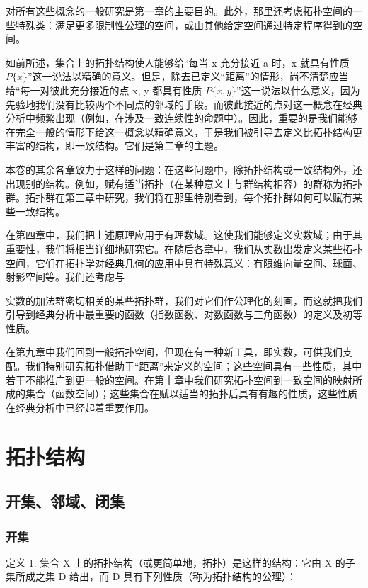 对所有这些概念的一般研究是第一章的主要目的。此外，那里还考虑拓扑空间的一些特殊类：满足更多限制性公理的空间，或由其他给定空间通过特定程序得到的空间。

如前所述，集合上的拓扑结构使人能够给“每当 x 充分接近 a 时，x 就具有性质 \(P\{x\}\)”这一说法以精确的意义。但是，除去已定义“距离”的情形，尚不清楚应当给“每一对彼此充分接近的点 x, y 都具有性质 \(P\{x, y\}\)”这一说法以什么意义，因为先验地我们没有比较两个不同点的邻域的手段。而彼此接近的点对这一概念在经典分析中频繁出现（例如，在涉及一致连续性的命题中）。因此，重要的是我们能够在完全一般的情形下给这一概念以精确意义，于是我们被引导去定义比拓扑结构更丰富的结构，即一致结构。它们是第二章的主题。

本卷的其余各章致力于这样的问题：在这些问题中，除拓扑结构或一致结构外，还出现别的结构。例如，赋有适当拓扑（在某种意义上与群结构相容）的群称为拓扑群。拓扑群在第三章中研究，我们将在那里特别看到，每个拓扑群如何可以赋有某些一致结构。

在第四章中，我们把上述原理应用于有理数域。这使我们能够定义实数域；由于其重要性，我们将相当详细地研究它。在随后各章中，我们从实数出发定义某些拓扑空间，它们在拓扑学对经典几何的应用中具有特殊意义：有限维向量空间、球面、射影空间等。我们还考虑与

实数的加法群密切相关的某些拓扑群，我们对它们作公理化的刻画，而这就把我们引导到经典分析中最重要的函数（指数函数、对数函数与三角函数）的定义及初等性质。

在第九章中我们回到一般拓扑空间，但现在有一种新工具，即实数，可供我们支配。我们特别研究拓扑借助于“距离”来定义的空间；这些空间具有一些性质，其中若干不能推广到更一般的空间。在第十章中我们研究拓扑空间到一致空间的映射所成的集合（函数空间）；这些集合在赋以适当的拓扑后具有有趣的性质，这些性质在经典分析中已经起着重要作用。

\chapter{拓扑结构}

\section{开集、邻域、闭集}

\subsection{开集}

定义 1. 集合 X 上的拓扑结构（或更简单地，拓扑）是这样的结构：它由 X 的子集所成之集 D 给出，而 D 具有下列性质（称为拓扑结构的公理）：

